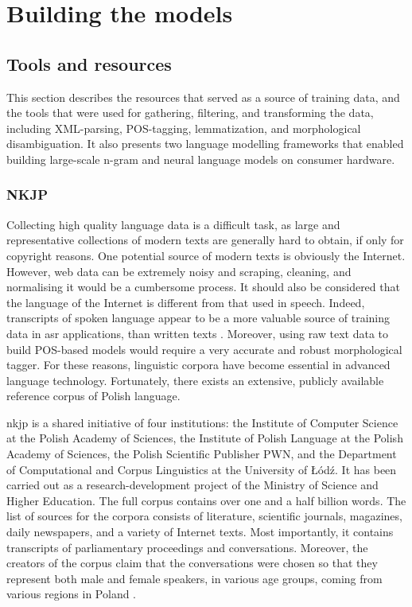 \chapter{Building the models}
\label{chapter:tools}
\section{Tools and resources}
This section describes the resources that served as a source of training data, and the tools that were used for gathering, filtering, and transforming the data, including \mbox{XML-parsing,} \mbox{POS-tagging,} lemmatization, and morphological disambiguation. It also presents two language modelling frameworks that enabled building large-scale n-gram and neural language models on consumer hardware.
\subsection{NKJP}
\label{section:nkjp}
Collecting high quality language data is a difficult task, as large and representative collections of modern texts are generally hard to obtain, if only for copyright reasons. One potential source of modern texts is obviously the Internet. However, web data can be extremely noisy and scraping, cleaning, and normalising it would be a cumbersome process. It should also be considered that the language of the Internet is different from that used in speech. Indeed, transcripts of spoken language appear to be a more valuable source of training data in \gls{asr} applications, than written texts \cite{dziadzio2015comparison}. Moreover, using raw text data to build POS-based models would require a very accurate and robust morphological tagger. For these reasons, linguistic corpora have become essential in advanced language technology. Fortunately, there exists an extensive, publicly available reference corpus of Polish language.

\gls{nkjp} is a shared initiative of four institutions: the Institute of Computer Science at the Polish Academy of Sciences, the Institute of Polish Language at the Polish Academy of Sciences, the Polish Scientific Publisher PWN, and the Department of Computational and Corpus Linguistics at the University of Łódź. It has been carried out as a research-development project of the Ministry of Science and Higher Education. The full corpus contains over one and a half billion words. The list of sources for the corpora consists of literature, scientific journals, magazines, daily newspapers, and a variety of Internet texts. Most importantly, it contains transcripts of parliamentary proceedings and conversations. Moreover, the creators of the corpus claim that the conversations were chosen so that they represent both male and female speakers, in various age groups, coming from various regions in Poland \cite{lewandowska2012narodowy}.

